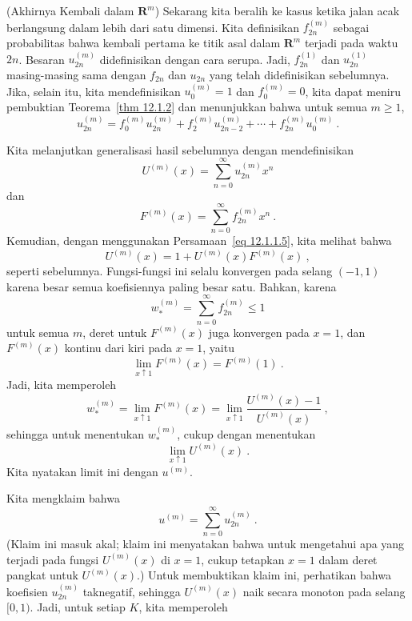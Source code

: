 \par
\begin{example}\label{exam 12.1.0.6}(Akhirnya Kembali dalam ${\mathbf R}^m$)
Sekarang kita beralih ke kasus ketika jalan acak berlangsung dalam lebih dari satu dimensi.
Kita definisikan $f^{(m)}_{2n}$ sebagai probabilitas bahwa kembali pertama ke titik asal dalam ${\mathbf
R}^m$ terjadi pada waktu $2n$.  Besaran $u^{(m)}_{2n}$ didefinisikan dengan cara serupa.  Jadi,
$f^{(1)}_{2n}$ dan $u^{(1)}_{2n}$ masing-masing sama dengan $f_{2n}$ dan $u_{2n}$ yang telah didefinisikan sebelumnya.  Jika,
selain itu, kita mendefinisikan $u^{(m)}_0 = 1$ dan $f^{(m)}_0 = 0$, kita dapat meniru pembuktian
Teorema~\ref{thm 12.1.2} dan menunjukkan bahwa untuk semua $m \ge 1$,
\begin{equation}
u^{(m)}_{2n} = f^{(m)}_0 u^{(m)}_{2n} + f^{(m)}_2 u^{(m)}_{2n-2} + \cdots +
f^{(m)}_{2n}u^{(m)}_0\ .
\label{eq 12.1.1.5}
\end{equation}
\par
Kita melanjutkan generalisasi hasil sebelumnya dengan mendefinisikan
$$U^{(m)}(x) = \sum_{n = 0}^\infty u^{(m)}_{2n} x^n$$
dan
$$F^{(m)}(x) = \sum_{n = 0}^\infty f^{(m)}_{2n} x^n\ .$$
Kemudian, dengan menggunakan Persamaan~\ref{eq 12.1.1.5}, kita melihat bahwa
$$U^{(m)}(x) = 1 + U^{(m)}(x) F^{(m)}(x)\ ,$$
seperti sebelumnya.  Fungsi-fungsi ini selalu konvergen pada selang $(-1, 1)$ karena besar
semua koefisiennya paling besar satu.  Bahkan, karena 
$$w^{(m)}_* = \sum_{n = 0}^\infty f^{(m)}_{2n} \le 1$$
untuk semua $m$, deret untuk $F^{(m)}(x)$ juga konvergen pada $x = 1$, dan $F^{(m)}(x)$
kontinu dari kiri pada $x = 1$, yaitu 
$$\lim_{x \uparrow 1} F^{(m)}(x) = F^{(m)}(1)\ .$$
Jadi, kita memperoleh
\begin{equation}
w^{(m)}_* = \lim_{x \uparrow 1} F^{(m)}(x) = \lim_{x \uparrow 1} 
\frac{U^{(m)}(x) - 1}{U^{(m)}(x)}\ ,
\label{eq 12.1.1.6}
\end{equation}
sehingga untuk menentukan $w^{(m)}_*$, cukup dengan menentukan 
$$\lim_{x \uparrow 1} U^{(m)}(x)\ .$$
Kita nyatakan limit ini dengan $u^{(m)}$.
\par
Kita mengklaim bahwa 
$$u^{(m)} = \sum_{n = 0}^\infty u^{(m)}_{2n}\ .$$
(Klaim ini masuk akal; klaim ini menyatakan bahwa untuk mengetahui apa yang terjadi pada fungsi $U^{(m)}(x)$ di
$x = 1$, cukup tetapkan $x = 1$ dalam deret pangkat untuk $U^{(m)}(x)$.)  Untuk membuktikan klaim ini, perhatikan
bahwa koefisien $u^{(m)}_{2n}$ taknegatif, sehingga $U^{(m)}(x)$ naik secara monoton pada
selang $[0, 1)$.  Jadi, untuk setiap $K$, kita memperoleh

\end{example}
